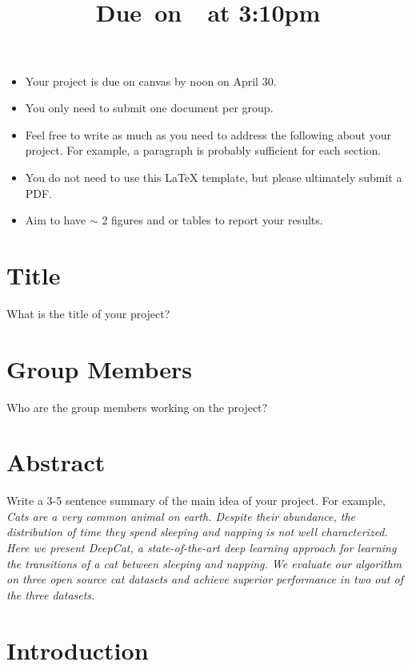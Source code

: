 \documentclass{article}
\title{
    \vspace{2in}
    \textmd{\textbf{\hmwkClass\hmwkTitle}}\\
    \normalsize\vspace{0.1in}\small{Due\ on\ \hmwkDueDate\ at 3:10pm}\\
    \vspace{3in}
}
\author{\hmwkAuthorName}
\date{}
\begin{document}

\begin{itemize}
\item Your project is due on canvas by noon on April 30. 
\item You only need to submit one document per group.
\item Feel free to write as much as you need to address the following about your project. For example, a paragraph is probably sufficient for each section. 
\item You do not need to use this LaTeX template, but please ultimately submit a PDF. 
\item Aim to have $\sim$ 2 figures and or tables to report your results. 
\end{itemize}

\section{Title}

What is the title of your project?

\section{Group Members}

Who are the group members working on the project? 

\section{Abstract}

Write a 3-5 sentence summary of the main idea of your project. For example, \\

\emph{Cats are a very common animal on earth. Despite their abundance, the distribution of time they spend sleeping and napping is not well characterized. Here we present DeepCat, a state-of-the-art deep learning approach for learning the transitions of a cat between sleeping and napping. We evaluate our algorithm on three open source cat datasets and achieve superior performance in two out of the three datasets.}

\section{Introduction}
\end{document}
